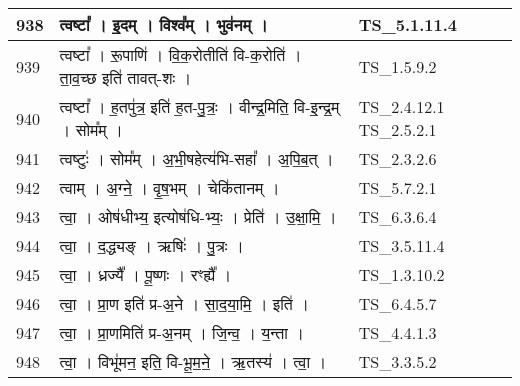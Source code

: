 \documentclass[17pt]{extarticle}
\begin{document}
\begin{longtable}{||p{0.4in}||p{4.9in}||p{0.9in}||}
    \hline
        
    938 & त्वष्टा᳚   ।   इ॒दम्   ।   विश्व᳚म्   ।   भुव॑नम्   ।    & TS\_5.1.11.4       \\
    
    \hline
        
    939 & त्वष्टा᳚   ।   रू॒पाणि॑   ।   वि॒क॒रोतीति॑ वि{-}क॒रोति॑   ।   ता॒व॒च्छ इति॑ तावत्{-}शः   ।    & TS\_1.5.9.2       \\
    
    \hline
        
    940 & त्वष्टा᳚   ।   ह॒तपु॑त्र॒ इति॑ ह॒त{-}पु॒त्रः॒   ।   वीन्द्र॒मिति॒ वि{-}इ॒न्द्र॒म्   ।   सोम᳚म्   ।    & TS\_2.4.12.1 TS\_2.5.2.1       \\
    
    \hline
        
    941 & त्वष्टुः॑   ।   सोम᳚म्   ।   अ॒भी॒षहेत्य॑भि{-}सहा᳚   ।   अ॒पि॒ब॒त्   ।    & TS\_2.3.2.6       \\
    
    \hline
        
    942 & त्वाम्   ।   अ॒ग्ने॒   ।   वृ॒ष॒भम्   ।   चेकि॑तानम्   ।    & TS\_5.7.2.1       \\
    
    \hline
        
    943 & त्वा॒   ।   ओष॑धीभ्य॒ इत्योष॑धि{-}भ्यः॒   ।   प्रेति॑   ।   उ॒क्षा॒मि॒   ।    & TS\_6.3.6.4       \\
    
    \hline
        
    944 & त्वा॒   ।   द॒द्ध्यङ्   ।   ऋषिः॑   ।   पु॒त्रः   ।    & TS\_3.5.11.4       \\
    
    \hline
        
    945 & त्वा॒   ।   ध्रज्यै᳚   ।   पू॒ष्णः   ।   रꣳह्यै᳚   ।    & TS\_1.3.10.2       \\
    
    \hline
        
    946 & त्वा॒   ।   प्रा॒ण इति॑ प्र{-}अ॒ने   ।   सा॒द॒या॒मि॒   ।   इति॑   ।    & TS\_6.4.5.7       \\
    
    \hline
        
    947 & त्वा॒   ।   प्रा॒णमिति॑ प्र{-}अ॒नम्   ।   जि॒न्व॒   ।   य॒न्ता   ।    & TS\_4.4.1.3       \\
    
    \hline
        
    948 & त्वा॒   ।   विभू॑मन॒ इति॒ वि{-}भू॒म॒ने॒   ।   ऋ॒तस्य॑   ।   त्वा॒   ।    & TS\_3.3.5.2       \\
    

\end{longtable}
\end{document}
